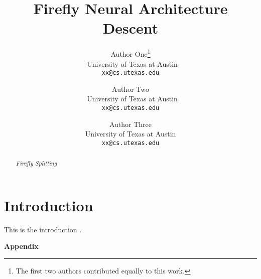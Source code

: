 \documentclass[11pt]{article}
\title{\huge Firefly Neural Architecture Descent}
\author{%
	Author One\thanks{The first two authors contributed equally to this work.}\\
    ~University of Texas at Austin\\
	\texttt{xx@cs.utexas.edu}
	\and
	Author Two\printfnsymbol{1}\\
	~University of Texas at Austin\\
	\texttt{xx@cs.utexas.edu} \\
	\and 
	Author Three\\
	University of Texas at Austin\\
	\texttt{xx@cs.utexas.edu} \\
}
\date{}
\begin{document}
\maketitle



\begin{abstract}
  \emph{Firefly Splitting} 
\end{abstract}


\section{Introduction}

This is the introduction \citep{sutton98beinforcement}.




\clearpage

%


\clearpage

\onecolumn
\appendix
\begin{center}
\Large
\textbf{Appendix}
\end{center}



%
\end{document}

